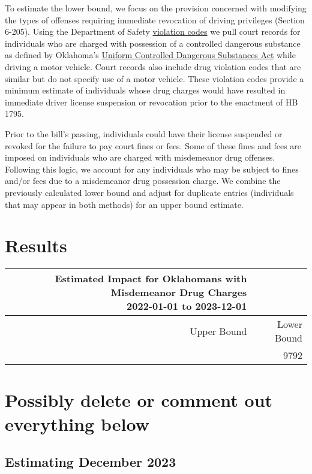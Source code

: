 \documentclass[
  letterpaper,
  DIV=11,
  numbers=noendperiod]{scrartcl}
\begin{document}
To estimate the lower bound, we focus on the provision concerned with
modifying the types of offenses requiring immediate revocation of
driving privileges (Section 6-205). Using the Department of Safety
\href{https://oklahoma.gov/content/dam/ok/en/dps/VCB\%20February\%202022.pdf}{violation
codes} we pull court records for individuals who are charged with
possession of a controlled dangerous substance as defined by Oklahoma's
\href{http://www.oklegislature.gov/cf_pdf/2003-04\%20INT/hb/HB2166\%20int.pdf}{Uniform
Controlled Dangerous Substances Act} while driving a motor vehicle.
Court records also include drug violation codes that are similar but do
not specify use of a motor vehicle. These violation codes provide a
minimum estimate of individuals whose drug charges would have resulted
in immediate driver license suspension or revocation prior to the
enactment of HB 1795.

Prior to the bill's passing, individuals could have their license
suspended or revoked for the failure to pay court fines or fees. Some of
these fines and fees are imposed on individuals who are charged with
misdemeanor drug offenses. Following this logic, we account for any
individuals who may be subject to fines and/or fees due to a misdemeanor
drug possession charge. We combine the previously calculated lower bound
and adjust for duplicate entries (individuals that may appear in both
methods) for an upper bound estimate.

\section{Results}\label{results}

\begingroup
\fontsize{12.0pt}{14.4pt}\selectfont
\begin{longtable*}{rr}
\caption*{
{\large Estimated Impact for Oklahomans with Misdemeanor Drug Charges} \\ 
{\small 2022-01-01 to 2023-12-01}
} \\ 
\toprule
Upper Bound & Lower Bound \\ 
\midrule{} & 9792 \\ 
\bottomrule
\end{longtable*}
\endgroup

\section{Possibly delete or comment out everything
below}\label{possibly-delete-or-comment-out-everything-below}

\subsection{Estimating December 2023}\label{estimating-december-2023}
\end{document}
